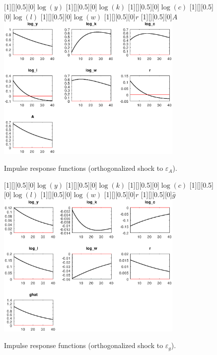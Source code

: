  
\begin{figure}[H]
[1][][0.5][0]{${\log(y)}$}
[1][][0.5][0]{${\log(k)}$}
[1][][0.5][0]{${\log(c)}$}
[1][][0.5][0]{${\log(l)}$}
[1][][0.5][0]{${\log(w)}$}
[1][][0.5][0]{${r}$}
[1][][0.5][0]{${A}$}
\centering 
\includegraphics[width=0.80\textwidth]{RBCp_IRF_eps_A}
\caption{Impulse response functions (orthogonalized shock to ${\varepsilon_A}$).}
\label{Fig:IRF:eps_A}
\end{figure}
 
\begin{figure}[H]
[1][][0.5][0]{${\log(y)}$}
[1][][0.5][0]{${\log(k)}$}
[1][][0.5][0]{${\log(c)}$}
[1][][0.5][0]{${\log(l)}$}
[1][][0.5][0]{${\log(w)}$}
[1][][0.5][0]{${r}$}
[1][][0.5][0]{${\hat g}$}
\centering 
\includegraphics[width=0.80\textwidth]{RBCp_IRF_eps_g}
\caption{Impulse response functions (orthogonalized shock to ${\varepsilon_g}$).}
\label{Fig:IRF:eps_g}
\end{figure}
 
 
